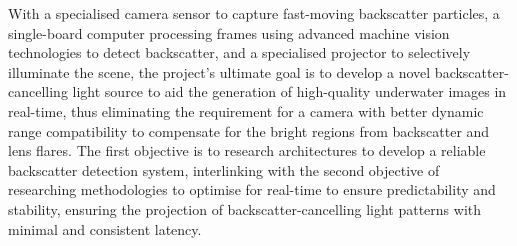 With a specialised camera sensor to capture fast-moving backscatter particles, a single-board computer processing frames using advanced machine vision technologies to detect backscatter, and a specialised projector to selectively illuminate the scene, the project's ultimate goal is to develop a novel backscatter-cancelling light source to aid the generation of high-quality underwater images in real-time, thus eliminating the requirement for a camera with better dynamic range compatibility to compensate for the bright regions from backscatter and lens flares. The first objective is to research architectures to develop a reliable backscatter detection system, interlinking with the second objective of researching methodologies to optimise for real-time to ensure predictability and stability, ensuring the projection of backscatter-cancelling light patterns with minimal and consistent latency.

